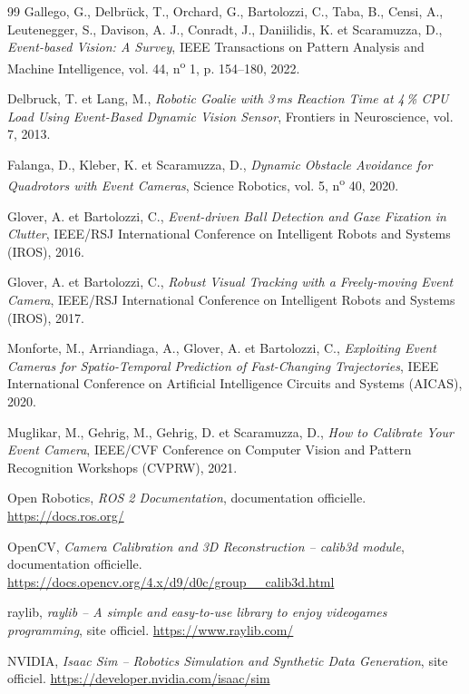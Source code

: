 \documentclass[a4paper,11pt]{report}
\begin{document}
\begin{thebibliography}{99}
Gallego, G., Delbrück, T., Orchard, G., Bartolozzi, C., Taba, B., Censi, A., Leutenegger, S., Davison, A. J., Conradt, J., Daniilidis, K. et Scaramuzza, D.,
\emph{Event-based Vision: A Survey},
IEEE Transactions on Pattern Analysis and Machine Intelligence, vol. 44, n\textsuperscript{o} 1, p. 154--180, 2022.

Delbruck, T. et Lang, M.,
\emph{Robotic Goalie with 3\,ms Reaction Time at 4\,\% CPU Load Using Event-Based Dynamic Vision Sensor},
Frontiers in Neuroscience, vol. 7, 2013.

Falanga, D., Kleber, K. et Scaramuzza, D.,
\emph{Dynamic Obstacle Avoidance for Quadrotors with Event Cameras},
Science Robotics, vol. 5, n\textsuperscript{o} 40, 2020.

Glover, A. et Bartolozzi, C.,
\emph{Event-driven Ball Detection and Gaze Fixation in Clutter},
IEEE/RSJ International Conference on Intelligent Robots and Systems (IROS), 2016.

Glover, A. et Bartolozzi, C.,
\emph{Robust Visual Tracking with a Freely-moving Event Camera},
IEEE/RSJ International Conference on Intelligent Robots and Systems (IROS), 2017.

Monforte, M., Arriandiaga, A., Glover, A. et Bartolozzi, C.,
\emph{Exploiting Event Cameras for Spatio-Temporal Prediction of Fast-Changing Trajectories},
IEEE International Conference on Artificial Intelligence Circuits and Systems (AICAS), 2020.

Muglikar, M., Gehrig, M., Gehrig, D. et Scaramuzza, D.,
\emph{How to Calibrate Your Event Camera},
IEEE/CVF Conference on Computer Vision and Pattern Recognition Workshops (CVPRW), 2021.

Open Robotics,
\emph{ROS 2 Documentation}, documentation officielle.
\url{https://docs.ros.org/}

OpenCV,
\emph{Camera Calibration and 3D Reconstruction -- calib3d module}, documentation officielle.
\url{https://docs.opencv.org/4.x/d9/d0c/group__calib3d.html}

raylib,
\emph{raylib -- A simple and easy-to-use library to enjoy videogames programming}, site officiel.
\url{https://www.raylib.com/}

NVIDIA,
\emph{Isaac Sim -- Robotics Simulation and Synthetic Data Generation}, site officiel.
\url{https://developer.nvidia.com/isaac/sim}


\end{thebibliography}
\end{document}
